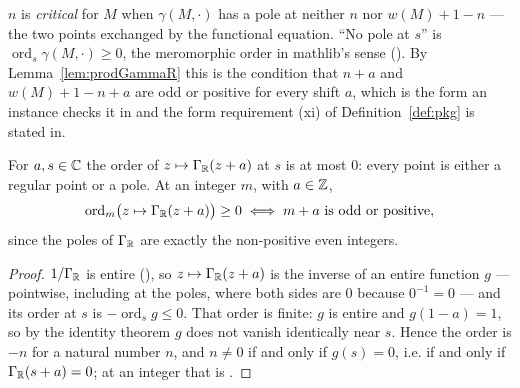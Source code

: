 \begin{definition}
  \label{def:isCritical}
  \leanok
  $n$ is \emph{critical} for $M$ when $\gamma(M,\cdot)$ has a pole at neither $n$ nor
  $w(M)+1-n$ ---
  the two points exchanged by the functional equation. ``No pole at $s$'' is
  $\operatorname{ord}_{s}\gamma(M,\cdot) \geq 0$, the meromorphic order in mathlib's sense
  (). By Lemma~\ref{lem:prodGammaR} this is the condition that $n + a$
  and $w(M) + 1 - n + a$ are odd or positive for every shift $a$, which is the form an instance
  checks it in and the form requirement (xi) of Definition~\ref{def:pkg} is stated in.
\end{definition}

\begin{lemma}
  \label{lem:GammaR-pole}
  \leanok
  For $a, s \in \mathbb{C}$ the order of $z \mapsto \Gamma_{\mathbb{R}}(z+a)$ at $s$ is at most $0$: every point
  is either a regular point or a pole. At an integer $m$, with $a \in \mathbb{Z}$,
  \[ \operatorname{ord}_{m}\bigl(z \mapsto \Gamma_{\mathbb{R}}(z+a)\bigr) \geq 0
     \iff m+a \text{ is odd or positive}, \]
  since the poles of $\Gamma_{\mathbb{R}}$ are exactly the non-positive even integers.
\end{lemma}
\begin{proof}
  \leanok
  $1/\Gamma_{\mathbb{R}}$ is entire (), so
  $z \mapsto \Gamma_{\mathbb{R}}(z+a)$ is the inverse of an entire function $g$ --- pointwise, including
  at the poles, where both sides are $0$ because $0^{-1} = 0$ --- and its order at $s$ is
  $-\operatorname{ord}_s g \leq 0$. That order is finite: $g$ is entire and $g(1-a) = 1$, so by
  the identity theorem $g$ does not vanish identically near $s$. Hence the order is $-n$ for a
  natural number $n$, and $n \neq 0$ if and only if $g(s) = 0$, i.e. if and only if
  $\Gamma_{\mathbb{R}}(s+a) = 0$; at an integer that is .
\end{proof}

